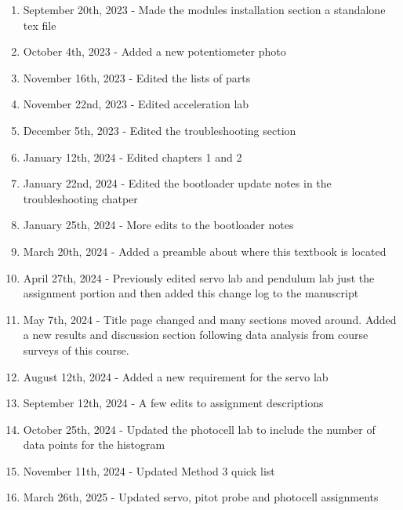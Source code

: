 \documentclass{article}
\begin{document}
\begin{enumerate}[itemsep=-5pt]
\item September 20th, 2023 - Made the modules installation section a standalone tex file
\item October 4th, 2023 - Added a new potentiometer photo
\item November 16th, 2023 - Edited the lists of parts 
\item November 22nd, 2023 - Edited acceleration lab
\item December 5th, 2023 - Edited the troubleshooting section
\item January 12th, 2024 - Edited chapters 1 and 2
\item January 22nd, 2024 - Edited the bootloader update notes in the troubleshooting chatper
\item January 25th, 2024 - More edits to the bootloader notes
\item March 20th, 2024 - Added a preamble about where this textbook is located
\item April 27th, 2024 - Previously edited servo lab and pendulum lab just the assignment portion and then added this change log to the manuscript
\item May 7th, 2024 - Title page changed and many sections moved around. Added a new results and discussion section following data analysis from course surveys of this course.
\item August 12th, 2024 - Added a new requirement for the servo lab
\item September 12th, 2024 - A few edits to assignment descriptions
\item October 25th, 2024 - Updated the photocell lab to include the number of data points for the histogram
\item November 11th, 2024 - Updated Method 3 quick list
\item March 26th, 2025 - Updated servo, pitot probe and photocell assignments
\end{enumerate}

\newpage

\tableofcontents

\newpage













\end{document}
